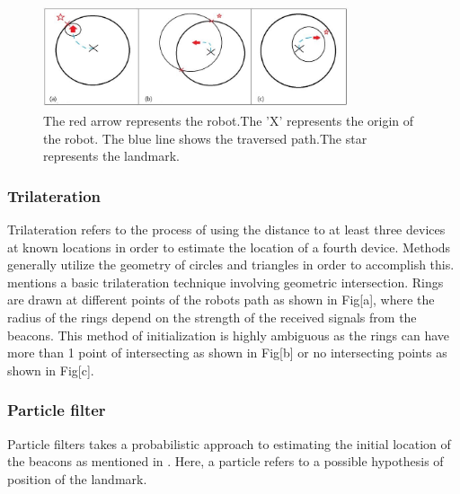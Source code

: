 \documentclass[conference]{IEEEtran}
\begin{document}
			\begin{figure}
				\centering
				\includegraphics[height=30mm,width=90mm]{Trilateration_methods.JPG}
				\caption{The red arrow represents the robot.The 'X' represents the origin of the robot. The blue line shows the traversed path.The star represents the landmark. }
			\end{figure}
		
			\subsubsection{Trilateration}
				Trilateration refers to the process of using the distance to at least three devices at known locations in order to estimate the location of a fourth device. Methods generally utilize the geometry of circles and triangles in order to accomplish this. \cite{Thrun2002} mentions a basic trilateration technique involving geometric intersection. Rings are drawn at different points of the robots path as shown in Fig[a], where the radius of the rings depend on the strength of the received signals from the beacons. This method of initialization is highly ambiguous as the rings can have more than 1 point of intersecting as shown in Fig[b]  or no  intersecting points as shown in Fig[c]. %
		
			\subsubsection{Particle filter}
				Particle filters takes a probabilistic approach to estimating the initial location of the beacons as mentioned in \cite{Thrun2002a}. Here, a particle refers to a  possible hypothesis of position of the landmark. 
				
\end{document}
